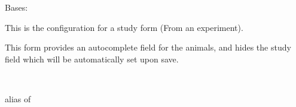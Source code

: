 \documentclass[letterpaper,10pt,english]{sphinxmanual}
\begin{document}
\begin{fulllineitems}
\label{api:data.forms.StudyExperimentForm}
Bases: 

This is the configuration for a study form (From an experiment).

This form provides an autocomplete field for the animals, and hides the study field which will be automatically set upon save.


\begin{fulllineitems}
\label{api:data.forms.StudyExperimentForm.Media}
\end{fulllineitems}



\begin{fulllineitems}
\label{api:data.forms.StudyExperimentForm.Meta}~

\begin{fulllineitems}
\label{api:data.forms.StudyExperimentForm.Meta.model}
alias of 

\end{fulllineitems}


\end{fulllineitems}



\begin{fulllineitems}
\label{api:data.forms.StudyExperimentForm.media}
\end{fulllineitems}


\end{fulllineitems}


\end{document}
